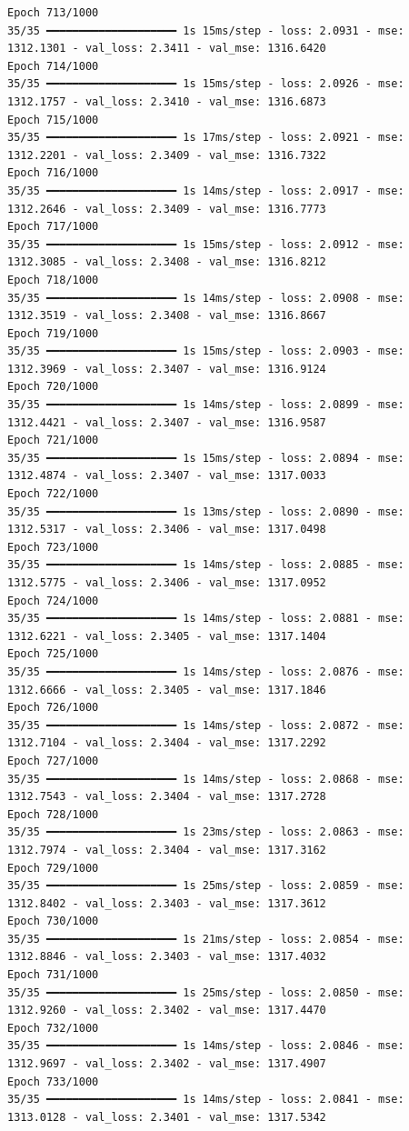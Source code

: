 \documentclass[
  letterpaper,
  DIV=11,
  numbers=noendperiod]{scrreprt}
\begin{document}
\begin{verbatim}
Epoch 713/1000
35/35 ━━━━━━━━━━━━━━━━━━━━ 1s 15ms/step - loss: 2.0931 - mse: 1312.1301 - val_loss: 2.3411 - val_mse: 1316.6420
Epoch 714/1000
35/35 ━━━━━━━━━━━━━━━━━━━━ 1s 15ms/step - loss: 2.0926 - mse: 1312.1757 - val_loss: 2.3410 - val_mse: 1316.6873
Epoch 715/1000
35/35 ━━━━━━━━━━━━━━━━━━━━ 1s 17ms/step - loss: 2.0921 - mse: 1312.2201 - val_loss: 2.3409 - val_mse: 1316.7322
Epoch 716/1000
35/35 ━━━━━━━━━━━━━━━━━━━━ 1s 14ms/step - loss: 2.0917 - mse: 1312.2646 - val_loss: 2.3409 - val_mse: 1316.7773
Epoch 717/1000
35/35 ━━━━━━━━━━━━━━━━━━━━ 1s 15ms/step - loss: 2.0912 - mse: 1312.3085 - val_loss: 2.3408 - val_mse: 1316.8212
Epoch 718/1000
35/35 ━━━━━━━━━━━━━━━━━━━━ 1s 14ms/step - loss: 2.0908 - mse: 1312.3519 - val_loss: 2.3408 - val_mse: 1316.8667
Epoch 719/1000
35/35 ━━━━━━━━━━━━━━━━━━━━ 1s 15ms/step - loss: 2.0903 - mse: 1312.3969 - val_loss: 2.3407 - val_mse: 1316.9124
Epoch 720/1000
35/35 ━━━━━━━━━━━━━━━━━━━━ 1s 14ms/step - loss: 2.0899 - mse: 1312.4421 - val_loss: 2.3407 - val_mse: 1316.9587
Epoch 721/1000
35/35 ━━━━━━━━━━━━━━━━━━━━ 1s 15ms/step - loss: 2.0894 - mse: 1312.4874 - val_loss: 2.3407 - val_mse: 1317.0033
Epoch 722/1000
35/35 ━━━━━━━━━━━━━━━━━━━━ 1s 13ms/step - loss: 2.0890 - mse: 1312.5317 - val_loss: 2.3406 - val_mse: 1317.0498
Epoch 723/1000
35/35 ━━━━━━━━━━━━━━━━━━━━ 1s 14ms/step - loss: 2.0885 - mse: 1312.5775 - val_loss: 2.3406 - val_mse: 1317.0952
Epoch 724/1000
35/35 ━━━━━━━━━━━━━━━━━━━━ 1s 14ms/step - loss: 2.0881 - mse: 1312.6221 - val_loss: 2.3405 - val_mse: 1317.1404
Epoch 725/1000
35/35 ━━━━━━━━━━━━━━━━━━━━ 1s 14ms/step - loss: 2.0876 - mse: 1312.6666 - val_loss: 2.3405 - val_mse: 1317.1846
Epoch 726/1000
35/35 ━━━━━━━━━━━━━━━━━━━━ 1s 14ms/step - loss: 2.0872 - mse: 1312.7104 - val_loss: 2.3404 - val_mse: 1317.2292
Epoch 727/1000
35/35 ━━━━━━━━━━━━━━━━━━━━ 1s 14ms/step - loss: 2.0868 - mse: 1312.7543 - val_loss: 2.3404 - val_mse: 1317.2728
Epoch 728/1000
35/35 ━━━━━━━━━━━━━━━━━━━━ 1s 23ms/step - loss: 2.0863 - mse: 1312.7974 - val_loss: 2.3404 - val_mse: 1317.3162
Epoch 729/1000
35/35 ━━━━━━━━━━━━━━━━━━━━ 1s 25ms/step - loss: 2.0859 - mse: 1312.8402 - val_loss: 2.3403 - val_mse: 1317.3612
Epoch 730/1000
35/35 ━━━━━━━━━━━━━━━━━━━━ 1s 21ms/step - loss: 2.0854 - mse: 1312.8846 - val_loss: 2.3403 - val_mse: 1317.4032
Epoch 731/1000
35/35 ━━━━━━━━━━━━━━━━━━━━ 1s 25ms/step - loss: 2.0850 - mse: 1312.9260 - val_loss: 2.3402 - val_mse: 1317.4470
Epoch 732/1000
35/35 ━━━━━━━━━━━━━━━━━━━━ 1s 14ms/step - loss: 2.0846 - mse: 1312.9697 - val_loss: 2.3402 - val_mse: 1317.4907
Epoch 733/1000
35/35 ━━━━━━━━━━━━━━━━━━━━ 1s 14ms/step - loss: 2.0841 - mse: 1313.0128 - val_loss: 2.3401 - val_mse: 1317.5342

\end{verbatim}
\end{document}
